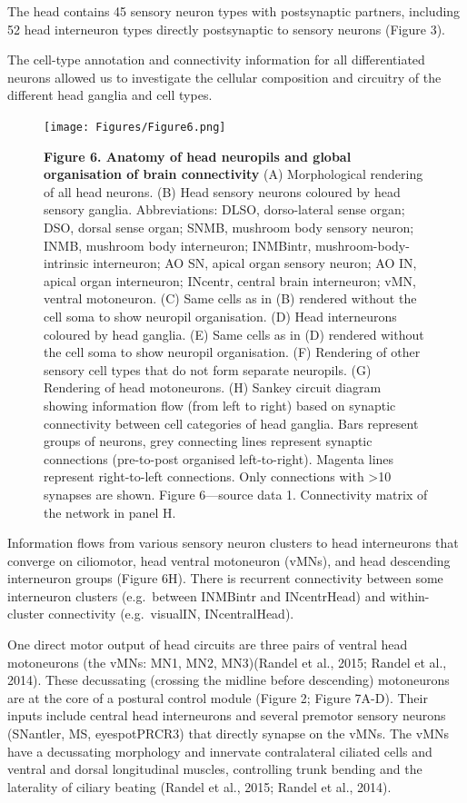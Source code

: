 \documentclass[
  11pt,
]{article}
\begin{document}
The head contains 45 sensory neuron types with postsynaptic partners,
including 52 head interneuron types directly postsynaptic to sensory
neurons (Figure 3).

The cell-type annotation and connectivity information for all
differentiated neurons allowed us to investigate the cellular
composition and circuitry of the different head ganglia and cell types.

\begin{figure}[H]

{\centering \texttt{[image: Figures/Figure6.png]}

}

\caption{\textbf{Figure 6. Anatomy of head neuropils and global
organisation of brain connectivity} (A) Morphological rendering of all
head neurons. (B) Head sensory neurons coloured by head sensory ganglia.
Abbreviations: DLSO, dorso-lateral sense organ; DSO, dorsal sense organ;
SNMB, mushroom body sensory neuron; INMB, mushroom body interneuron;
INMBintr, mushroom-body-intrinsic interneuron; AO SN, apical organ
sensory neuron; AO IN, apical organ interneuron; INcentr, central brain
interneuron; vMN, ventral motoneuron. (C) Same cells as in (B) rendered
without the cell soma to show neuropil organisation. (D) Head
interneurons coloured by head ganglia. (E) Same cells as in (D) rendered
without the cell soma to show neuropil organisation. (F) Rendering of
other sensory cell types that do not form separate neuropils. (G)
Rendering of head motoneurons. (H) Sankey circuit diagram showing
information flow (from left to right) based on synaptic connectivity
between cell categories of head ganglia. Bars represent groups of
neurons, grey connecting lines represent synaptic connections
(pre-to-post organised left-to-right). Magenta lines represent
right-to-left connections. Only connections with \textgreater10 synapses
are shown. Figure 6---source data 1. Connectivity matrix of the network
in panel H.}

\end{figure}%

Information flows from various sensory neuron clusters to head
interneurons that converge on ciliomotor, head ventral motoneuron
(vMNs), and head descending interneuron groups (Figure 6H). There is
recurrent connectivity between some interneuron clusters (e.g.~between
INMBintr and INcentrHead) and within-cluster connectivity
(e.g.~visualIN, INcentralHead).

One direct motor output of head circuits are three pairs of ventral head
motoneurons (the vMNs: MN1, MN2, MN3)(Randel et al., 2015; Randel et
al., 2014). These decussating (crossing the midline before descending)
motoneurons are at the core of a postural control module (Figure 2;
Figure 7A-D). Their inputs include central head interneurons and several
premotor sensory neurons (SNantler, MS, eyespotPRCR3) that directly
synapse on the vMNs. The vMNs have a decussating morphology and
innervate contralateral ciliated cells and ventral and dorsal
longitudinal muscles, controlling trunk bending and the laterality of
ciliary beating (Randel et al., 2015; Randel et al., 2014).
\end{document}
